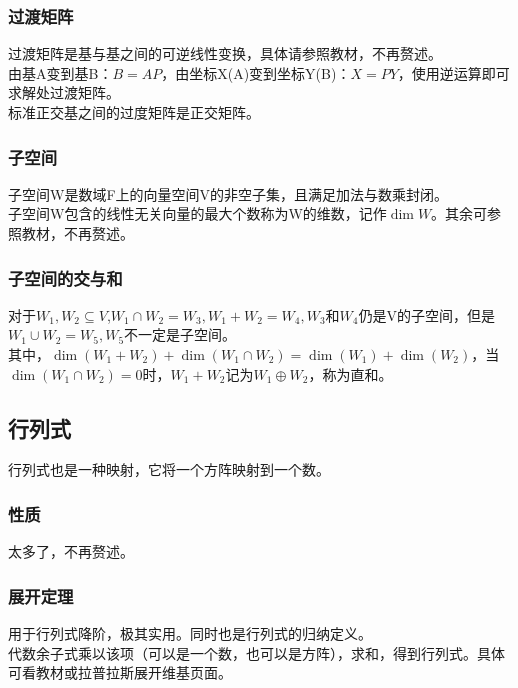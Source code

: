\documentclass[UTF8]{ctexart}
\begin{document}
	\subsubsection{过渡矩阵}
	过渡矩阵是基与基之间的可逆线性变换，具体请参照教材，不再赘述。\\
	\indent
	由基A变到基B：$B=AP$，由坐标X(A)变到坐标Y(B)：$X=PY$，使用逆运算即可求解处过渡矩阵。\\
	\indent
	标准正交基之间的过度矩阵是正交矩阵。
	\subsubsection{子空间}
	子空间W是数域F上的向量空间V的非空子集，且满足加法与数乘封闭。\\
	\indent
	子空间W包含的线性无关向量的最大个数称为W的维数，记作$ \dim W $。其余可参照教材，不再赘述。
	\subsubsection{子空间的交与和}
	对于$W_1,W_2\subseteq V$,$W_1\cap W_2=W_3,W_1+W_2=W_4,W_3$和$W_4$仍是V的子空间，但是$W_1\cup W_2=W_5,W_5$不一定是子空间。\\
	\indent
	其中，$\dim(W_1+W_2)+\dim(W_1\cap W_2)=\dim(W_1)+\dim(W_2)$，当$\dim(W_1\cap W_2)=0$时，$W_1+W_2$记为$W_1\oplus W_2$，称为直和。\\
	\subsection{行列式}
	行列式也是一种映射，它将一个方阵映射到一个数。\\
	\indent
	\subsubsection{性质}
	太多了，不再赘述。
	\subsubsection{展开定理}
	用于行列式降阶，极其实用。同时也是行列式的归纳定义。\\
	\indent
	代数余子式乘以该项（可以是一个数，也可以是方阵），求和，得到行列式。具体可看教材或拉普拉斯展开维基页面。
\end{document}
